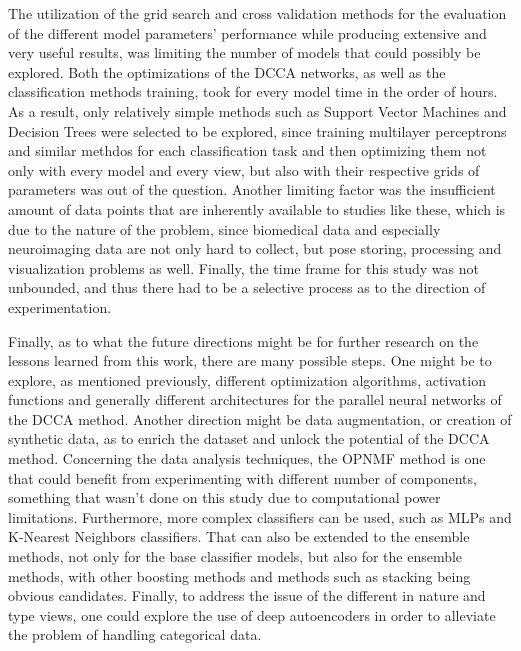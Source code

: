 {%
The utilization of the grid search and cross validation methods for the evaluation of the different model parameters' performance while producing extensive and very useful results, was limiting the number of models that could possibly be explored. Both the optimizations of the DCCA networks, as well as the classification methods training, took for every model time in the order of hours. As a result, only relatively simple methods such as Support Vector Machines and Decision Trees were selected to be explored, since training multilayer perceptrons and similar methdos for each classification task and then optimizing them not only with every model and every view, but also with their respective grids of parameters was out of the question. Another limiting factor was the insufficient amount of data points that are inherently available to studies like these, which is due to the nature of the problem, since biomedical data and especially neuroimaging data are not only hard to collect, but pose storing, processing and visualization problems as well. Finally, the time frame for this study was not unbounded, and thus there had to be a selective process as to the direction of experimentation. 

Finally, as to what the future directions might be for further research on the lessons learned from this work, there are many possible steps. One might be to explore, as mentioned previously, different optimization algorithms, activation functions and generally different architectures for the parallel neural networks of the DCCA method. Another direction might be data augmentation, or creation of synthetic data, as to enrich the dataset and unlock the potential of the DCCA method. Concerning the data analysis techniques, the OPNMF method is one that could benefit from experimenting with different number of components, something that wasn't done on this study due to computational power limitations. Furthermore, more complex classifiers can be used, such as MLPs and K-Nearest Neighbors classifiers. That can also be extended to the ensemble methods, not only for the base classifier models, but also for the ensemble methods, with other boosting methods and methods such as stacking being obvious candidates. Finally, to address the issue of the different in nature and type views, one could explore the use of deep autoencoders in order to alleviate the problem of handling categorical data. }